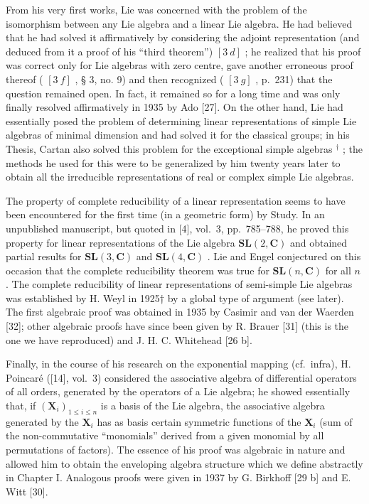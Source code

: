 From his very first works, Lie was concerned with the problem of the isomorphism between any Lie algebra and a linear Lie algebra. He had believed that he had solved it affirmatively by considering the adjoint representation (and deduced from it a proof of his ``third theorem'') \([3\ d]\) ; he realized that his proof was correct only for Lie algebras with zero centre, gave another erroneous proof thereof ( \([3\ f]\) , § 3, no. 9) and then recognized ( \([3\ g]\) , p.~231) that the question remained open. In fact, it remained so for a long time and was only finally resolved affirmatively in 1935 by Ado {[}27{]}. On the other hand, Lie had essentially posed the problem of determining linear representations of simple Lie algebras of minimal dimension and had solved it for the classical groups; in his Thesis, Cartan also solved this problem for the exceptional simple algebras \(^{\dagger}\) ; the methods he used for this were to be generalized by him twenty years later to obtain all the irreducible representations of real or complex simple Lie algebras.

The property of complete reducibility of a linear representation seems to have been encountered for the first time (in a geometric form) by Study. In an unpublished manuscript, but quoted in {[}4{]}, vol.~3, pp.~785--788, he proved this property for linear representations of the Lie algebra \(\mathbf{SL}(2,\mathbf{C})\) and obtained partial results for \(\mathbf{SL}(3,\mathbf{C})\) and \(\mathbf{SL}(4,\mathbf{C})\) . Lie and Engel conjectured on this occasion that the complete reducibility theorem was true for \(\mathbf{SL}(n,\mathbf{C})\) for all \(n\) . The complete reducibility of linear representations of semi-simple Lie algebras was established by H. Weyl in 1925† by a global type of argument (see later). The first algebraic proof was obtained in 1935 by Casimir and van der Waerden {[}32{]}; other algebraic proofs have since been given by R. Brauer {[}31{]} (this is the one we have reproduced) and J. H. C. Whitehead {[}26 b{]}.

Finally, in the course of his research on the exponential mapping (cf.~infra), H. Poincaré ({[}14{]}, vol.~3) considered the associative algebra of differential operators of all orders, generated by the operators of a Lie algebra; he showed essentially that, if \((\mathbf{X}_i)_{1\leqslant i\leqslant n}\) is a basis of the Lie algebra, the associative algebra generated by the \(\mathbf{X}_i\) has as basis certain symmetric functions of the \(\mathbf{X}_i\) (sum of the non-commutative ``monomials'' derived from a given monomial by all permutations of factors). The essence of his proof was algebraic in nature and allowed him to obtain the enveloping algebra structure which we define abstractly in Chapter I. Analogous proofs were given in 1937 by G. Birkhoff {[}29 b{]} and E. Witt {[}30{]}.

